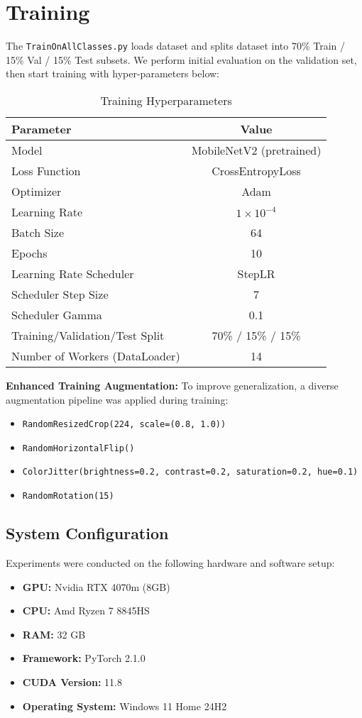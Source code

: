 \documentclass[a4paper,12pt]{report}
\begin{document}
\section{Training}
The \texttt{TrainOnAllClasses.py} loads dataset and splits dataset into 70\% Train / 15\% Val / 15\% Test subsets. We perform initial evaluation on the validation set, then start training with hyper-parameters below:
\begin{table}[H]
\centering
\caption{Training Hyperparameters}
\begin{tabular}{|l|c|}
\hline
\textbf{Parameter} & \textbf{Value} \\
\hline
Model & MobileNetV2 (pretrained) \\
Loss Function & CrossEntropyLoss \\
Optimizer & Adam \\
Learning Rate & $1 \times 10^{-4}$ \\
Batch Size & 64 \\
Epochs & 10 \\
Learning Rate Scheduler & StepLR \\
Scheduler Step Size & 7 \\
Scheduler Gamma & 0.1 \\
Training/Validation/Test Split & 70\% / 15\% / 15\% \\
Number of Workers (DataLoader) & 14 \\
\hline
\end{tabular}
\end{table}

\textbf{Enhanced Training Augmentation:} To improve generalization, a diverse augmentation pipeline was applied during training:
\begin{itemize}
  \item \texttt{RandomResizedCrop(224, scale=(0.8, 1.0))}
  \item \texttt{RandomHorizontalFlip()}
  \item \texttt{ColorJitter(brightness=0.2, contrast=0.2, saturation=0.2, hue=0.1)}
  \item \texttt{RandomRotation(15)}
\end{itemize}


\subsection{System Configuration}
Experiments were conducted on the following hardware and software setup:

\begin{itemize}
    \item \textbf{GPU:} Nvidia RTX 4070m (8GB)
    \item \textbf{CPU:} Amd Ryzen 7 8845HS
    \item \textbf{RAM:} 32 GB
    \item \textbf{Framework:} PyTorch 2.1.0
    \item \textbf{CUDA Version:} 11.8
    \item \textbf{Operating System:} Windows 11 Home 24H2
\end{itemize}
\end{document}

